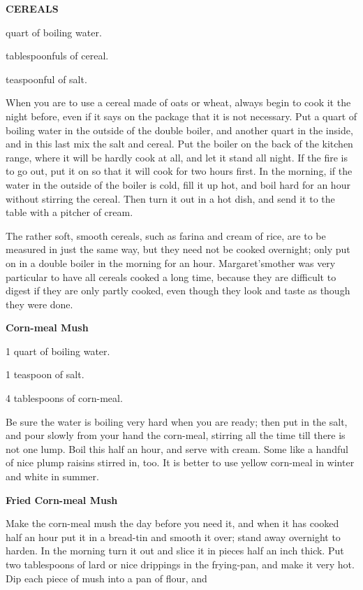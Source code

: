 \documentclass[11pt]{book}
\newcommand{\indpar}{\par\noindent\hspace*{\parindent}}
\newcommand{\ingredient}{\indpar}
\newcommand{\instruction}{\indpar}
\newenvironment{RecipeTitle}{\medskip\begin{center}\large\bf }{\end{center}\smallskip}
\newenvironment{FoodTypeTitle}{\begin{center}\large\bf }{\end{center}}
\begin{document}
\begin{FoodTypeTitle}
CEREALS\label{CEREALS}
\end{FoodTypeTitle}
\ingredient  {} quart of boiling water.
\ingredient  {} tablespoonfuls of cereal.
\ingredient  {} teaspoonful of salt.
\indpar
  When you are to use a cereal made of oats or wheat, always begin to cook it
the night before, even if it says on the package that it is not necessary.  Put
a quart of boiling water in the outside of the double boiler, and another quart
in the inside, and in this last mix the salt and cereal.  Put the boiler on the
back of the kitchen range, where it will be hardly cook at all, and let it
stand all night.  If the fire is to go out, put it on so that it will cook for
two hours first.  In the morning, if the water in the outside of the boiler
is cold, fill it up hot, and boil hard for an hour without stirring the
cereal.  Then turn it out in a hot dish, and send it to the table with a
pitcher of cream.
\indpar
  The rather soft, smooth cereals, such as farina and cream of rice, are to be
measured in just the same way, but they need not be cooked overnight; only
put on in a double boil\-er in the morning for an hour.  Margaret's\linebreak mother was
very particular to have all cereals cooked a long time, because they are
difficult to digest if they are only partly cooked, even though they look
and taste as though they were done.
\begin{RecipeTitle}
Corn-meal Mush\label{cornmeal_mush}
\end{RecipeTitle}
\ingredient  1 quart of boiling water.
\ingredient  1 teaspoon of salt.
\ingredient  4 tablespoons of corn-meal.
\instruction
  Be sure the water is boiling very hard when you are ready; then put in the
salt, and pour slowly from your hand the corn-meal, stirring all the time
till there is not one lump.  Boil this half an hour, and serve with cream.
Some like a handful of nice plump raisins stirred in, too.  It is better to
use yellow corn-meal in winter and white in summer.
\begin{RecipeTitle}
Fried Corn-meal Mush\label{fried_cornmeal_mush}
\end{RecipeTitle}
\instruction
  Make the corn-meal mush the day before you need it, and when it has cooked
half an hour put it in a bread-tin and smooth it over; stand away overnight
to harden.  In the morning turn it out and slice it in pieces half an inch
thick.  Put two tablespoons of lard or nice drippings in the frying-pan,
and make it very hot.  Dip each piece of mush into a pan of flour, and
\end{document}
